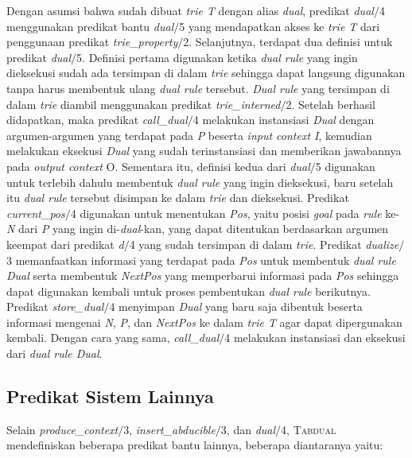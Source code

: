 Dengan asumsi bahwa sudah dibuat \textit{trie T} dengan alias \textit{dual}, predikat \textit{dual$/$}4 menggunakan predikat bantu \textit{dual$/$}5 yang mendapatkan akses ke \textit{trie T} dari penggunaan predikat \textit{trie\_property$/$}2. Selanjutnya, terdapat dua definisi untuk predikat \textit{dual$/$}5. Definisi pertama digunakan ketika \textit{dual rule} yang ingin dieksekusi sudah ada tersimpan di dalam \textit{trie} sehingga dapat langsung digunakan tanpa harus membentuk ulang \textit{dual rule} tersebut. \textit{Dual rule} yang tersimpan di dalam \textit{trie} diambil menggunakan predikat \textit{trie\_interned$/$}2. Setelah berhasil didapatkan, maka predikat \textit{call\_dual$/$}4 melakukan instansiasi \textit{Dual} dengan argumen-argumen yang terdapat pada \textit{P} beserta \textit{input context I}, kemudian melakukan eksekusi \textit{Dual} yang sudah terinstansiasi dan memberikan jawabannya pada \textit{output context} O. Sementara itu, definisi kedua dari \textit{dual$/$}5 digunakan untuk terlebih dahulu membentuk \textit{dual rule} yang ingin dieksekusi, baru setelah itu \textit{dual rule} tersebut disimpan ke dalam \textit{trie} dan dieksekusi. Predikat \textit{current\_pos$/$}4 digunakan untuk menentukan \textit{Pos}, yaitu posisi \textit{goal} pada \textit{rule} ke-\textit{N} dari \textit{P} yang ingin di-\textit{dual}-kan, yang dapat ditentukan berdasarkan argumen keempat dari predikat \textit{d$/$}4 yang sudah tersimpan di dalam \textit{trie}. Predikat \textit{dualize$/$}3 memanfaatkan informasi yang terdapat pada \textit{Pos} untuk membentuk \textit{dual rule Dual} serta membentuk \textit{NextPos } yang memperbarui informasi pada \textit{Pos} sehingga dapat digunakan kembali untuk proses pembentukan \textit{dual rule} berikutnya. Predikat \textit{store\_dual$/$}4 menyimpan \textit{Dual} yang baru saja dibentuk beserta informasi mengenai \textit{N}, \textit{P}, dan \textit{NextPos} ke dalam \textit{trie T} agar dapat dipergunakan kembali. Dengan cara yang sama, \textit{call\_dual$/$}4 melakukan instansiasi dan eksekusi dari \textit{dual rule Dual}.

\subsection{Predikat Sistem Lainnya}

Selain \textit{produce\_context$/$}3, \textit{insert\_abducible$/$}3, dan \textit{dual$/$}4, \textsc{Tabdual} mendefiniskan beberapa predikat bantu lainnya, beberapa diantaranya yaitu:

